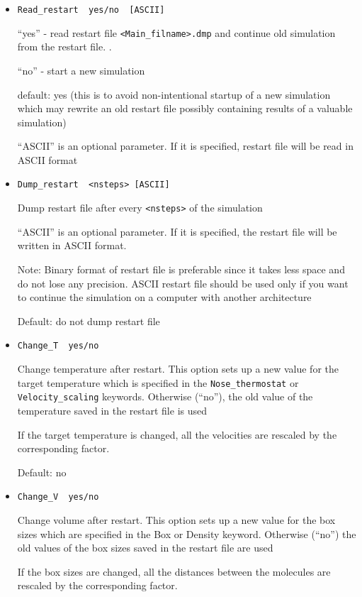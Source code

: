 \documentclass{article}
\begin{document}
\begin{itemize}

\item
\verb|Read_restart  yes/no  [ASCII]|

``yes'' - read restart file \verb|<Main_filname>.dmp| and continue old 
simulation from the restart file.
.

``no''  - start a new simulation

default: yes  (this is to avoid non-intentional startup of a new simulation
which may rewrite an old restart file possibly containing results of a 
valuable simulation)

``ASCII'' is an optional parameter. If it is specified, restart file 
will be read in ASCII format 

\item
\verb|Dump_restart  <nsteps> [ASCII]|
 
Dump restart file after every \verb|<nsteps>| of the simulation

``ASCII'' is an optional parameter. If it is specified, the restart file 
will be written in ASCII format. 

Note: Binary format of restart file is preferable since it takes less 
space and do not lose any precision. ASCII restart file should be used only 
if you want to continue the simulation on a computer with another architecture

Default: do not dump restart file 

\item
\verb|Change_T  yes/no|

Change temperature after restart. This option sets up a new value for the 
target temperature which is specified in the \verb|Nose_thermostat| or 
\verb|Velocity_scaling| keywords. Otherwise (``no''), the old value of 
the temperature saved in the restart file is used

If the target temperature is changed, all the velocities are rescaled by
the corresponding factor.

Default: no

\item
\verb|Change_V  yes/no|

Change volume after restart. This option sets up a new value for the 
box sizes which are specified in the Box or Density keyword.
Otherwise (``no'') the old values of the box sizes saved in the
restart file are used

If the box sizes are changed, all the distances between the molecules 
are rescaled by the corresponding factor.


\end{itemize}
\end{document}
